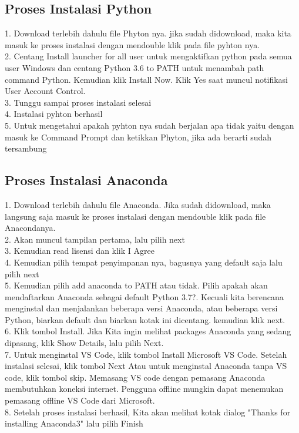 \subsection{Proses Instalasi Python}
1. Download terlebih dahulu file Phyton nya. jika sudah didownload, maka kita masuk ke proses instalasi dengan mendouble klik pada file pyhton nya.\\
2. Centang Install launcher for all user untuk mengaktifkan python pada semua user Windows dan centang Python 3.6 to PATH untuk menambah path command Python. Kemudian klik Install Now. Klik Yes saat muncul notifikasi User Account Control. \\
3. Tunggu sampai proses instalasi selesai\\
4. Instalasi pyhton berhasil\\
5. Untuk mengetahui apakah pyhton nya sudah berjalan apa tidak yaitu dengan masuk ke Command Prompt dan ketikkan Phyton, jika ada berarti sudah tersambung\\

\subsection{Proses Instalasi Anaconda}
1. Download terlebih dahulu file Anaconda. Jika sudah didownload, maka langsung saja masuk ke proses instalasi dengan mendouble klik pada file Anacondanya.\\
2. Akan muncul tampilan pertama, lalu pilih next\\
3. Kemudian read lisensi dan klik I Agree\\
4. Kemudian pilih tempat penyimpanan nya, bagusnya yang default saja lalu pilih next\\
5. Kemudian pilih add anaconda to PATH atau tidak. Pilih apakah akan mendaftarkan Anaconda sebagai default Python 3.7?. Kecuali kita berencana menginstal dan menjalankan beberapa versi Anaconda, atau beberapa versi Python, biarkan default dan biarkan kotak ini dicentang. kemudian klik next.\\
6. Klik tombol Install. Jika Kita ingin melihat packages Anaconda yang sedang dipasang, klik Show Details, lalu pilih Next.\\
7. Untuk menginstal VS Code, klik tombol Install Microsoft VS Code. Setelah instalasi selesai, klik tombol Next Atau untuk menginstal Anaconda tanpa VS code, klik tombol skip. Memasang VS code dengan pemasang Anaconda membutuhkan koneksi internet. Pengguna offline mungkin dapat menemukan pemasang offline VS Code dari Microsoft.\\
8. Setelah proses instalasi berhasil, Kita akan melihat kotak dialog "Thanks for installing Anaconda3" lalu pilih Finish\\

